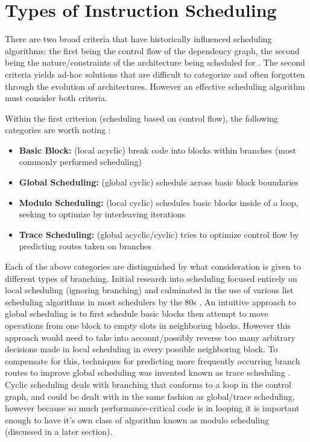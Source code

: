 \documentclass[12pt]{report}
\begin{document}
\section{Types of Instruction Scheduling}
\label{sec:orga9897a0}
There are two broad criteria that have historically influenced scheduling
algorithms: the first being the control flow of the dependency graph, the
second being the nature/constraints of the architecture being scheduled for
\parencite{rau1993instruction}. The second criteria yields ad-hoc solutions
that are difficult to categorize and often forgotten through the evolution of
architectures. However an effective scheduling algorithm must consider both criteria.

Within the first criterion (scheduling based on control flow), the following
categories are worth noting \parencite{rau1993instruction}:
\begin{itemize}
\item \textbf{Basic Block:} (local acyclic) break code into blocks within branches (most commonly performed scheduling)
\item \textbf{Global Scheduling:} (global cyclic) schedule across basic block boundaries
\item \textbf{Modulo Scheduling:} (local cyclic) schedules basic blocks inside of a loop, seeking to
optimize by interleaving iterations
\item \textbf{Trace Scheduling:} (global acyclic/cyclic) tries to optimize control flow by predicting routes
taken on branches
\end{itemize}
Each of the above categories are distinguished by what consideration is given
to different types of branching. Initial research into scheduling focused
entirely on local scheduling (ignoring branching)
\parencite{rau1993instruction} and culminated in the use of various list
scheduling algorithms in most schedulers by the 80s
\parencite{fisher1983very}. An intuitive approach to global scheduling is to
first schedule basic blocks then attempt to move operations from one block to
empty slots in neighboring blocks. However this approach would need to take
into account/possibly reverse too many arbitrary decisions made in local
scheduling in every possible neighboring block. To compensate for this,
techniques for predicting more frequently occurring branch routes to improve
global scheduling was invented known as trace scheduling
\parencite{fisher1981trace}. Cyclic scheduling deals with branching that
conforms to a loop in the control graph, and could be dealt with in the same
fashion as global/trace scheduling, however because so much
performance-critical code is in looping it is important enough to
have it's own class of algorithm known as modulo scheduling (discussed in a
later section).
\end{document}
